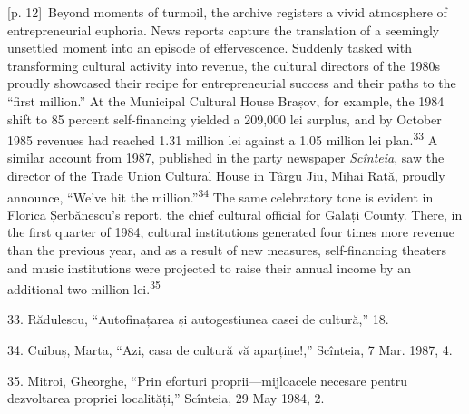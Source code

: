 \documentclass[10pt,a4paper]{article}
\begin{document}
{\scriptsize\color{gray} [p. 12]}\ Beyond moments of turmoil, the archive registers a vivid atmosphere of entrepreneurial euphoria. News reports capture the translation of a seemingly unsettled moment into an episode of effervescence. Suddenly tasked with transforming cultural activity into revenue, the cultural directors of the 1980s proudly showcased their recipe for entrepreneurial success and their paths to the “first million.” At the Municipal Cultural House Brașov, for example, the 1984 shift to 85 percent self-financing yielded a 209,000 lei surplus, and by October 1985 revenues had reached 1.31 million lei against a 1.05 million lei plan.\nobreak\textsuperscript{33} A similar account from 1987, published in the party newspaper \textit{Scînteia}, saw the director of the Trade Union Cultural House in Târgu Jiu, Mihai Rață, proudly announce, “We’ve hit the million.”\nobreak\textsuperscript{34} The same celebratory tone is evident in Florica Șerbănescu’s report, the chief cultural official for Galați County. There, in the first quarter of 1984, cultural institutions generated four times more revenue than the previous year, and as a result of new measures, self-financing theaters and music institutions were projected to raise their annual income by an additional two million lei.\nobreak\textsuperscript{35}\par{\small 33. Rădulescu, “Autofinațarea și autogestiunea casei de cultură,” 18.\par}{\small 34. Cuibuș, Marta, “Azi, casa de cultură vă aparține!,” Scînteia, 7 Mar. 1987, 4.\par}{\small 35. Mitroi, Gheorghe, “Prin eforturi proprii—mijloacele necesare pentru dezvoltarea propriei localități,” Scînteia, 29 May 1984, 2.\par}
\end{document}
